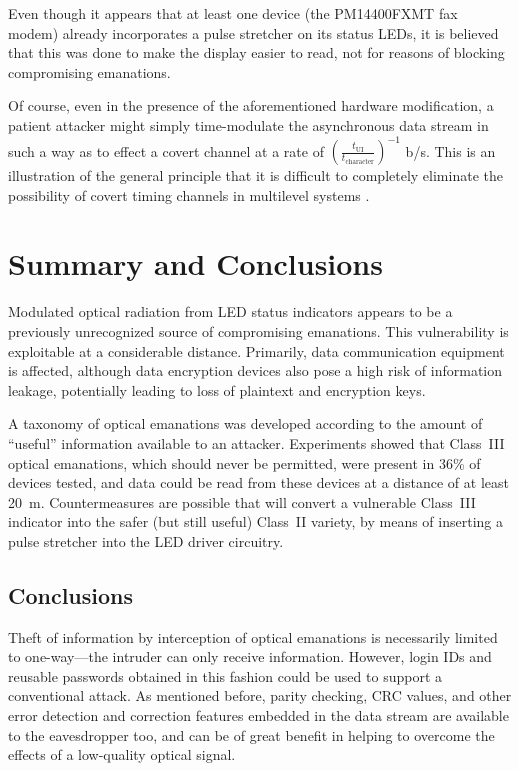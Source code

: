 \documentclass{acmtrans2e}
\begin{document}
Even though it appears that at least one device (the PM14400FXMT fax modem)
already incorporates a pulse stretcher on its status LEDs, it is
believed that this was done to make the display easier to read, not for
reasons of blocking compromising emanations.

Of course, even in the presence of the aforementioned hardware modification,
a patient attacker might simply time-modulate the asynchronous data stream
in such a way as to effect a covert channel at a rate of
${(\frac{t_\mathrm{UI}}{t_\mathrm{character}})}^{-1}$ b/s.  This is an
illustration of the general principle that it is difficult to completely
eliminate the possibility of covert timing channels in multilevel systems
\cite{pgn_covert_channels_paper}.

\section{Summary and Conclusions}

Modulated optical radiation from LED status indicators appears to be a 
previously unrecognized source of compromising emanations.  This 
vulnerability is exploitable at a considerable distance.  Primarily, data 
communication equipment is affected, although data encryption devices 
also pose a high risk of information leakage, potentially leading to loss of 
plaintext and encryption keys.

A taxonomy of optical emanations was developed according to the amount 
of ``useful'' information available to an attacker.  Experiments showed 
that Class~III optical emanations, which should never be permitted, were 
present in 36\% of devices tested, and data could be read from these 
devices at a distance of at least 20~m.  Countermeasures are 
possible that will convert a vulnerable Class~III indicator into the 
safer (but still useful) Class~II variety, by means of inserting a pulse
stretcher into the LED driver circuitry.

\subsection{Conclusions}

Theft of information by interception of optical emanations is necessarily 
limited to one-way---the intruder can only receive information.  
However, login IDs and reusable passwords obtained in this fashion 
could be used to support a conventional attack.  As mentioned before, 
parity checking, CRC values, and other error detection and correction features 
embedded in the data stream are available to the eavesdropper too, and can 
be of great benefit in helping to overcome the effects of a low-quality 
optical signal.
\end{document}

